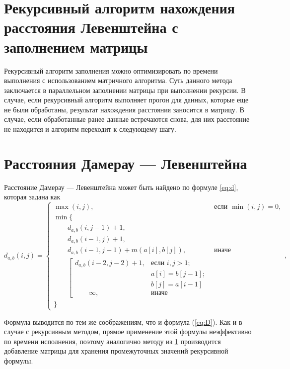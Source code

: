 \section{Рекурсивный алгоритм нахождения расстояния Левенштейна с заполнением матрицы}
\label{sec:recmat}

Рекурсивный алгоритм заполнения можно оптимизировать по времени выполнения с использованием матричного алгоритма. Суть данного метода заключается в параллельном заполнении матрицы при выполнении рекурсии. В случае, если рекурсивный алгоритм выполняет прогон для данных, которые еще не были обработаны, результат нахождения расстояния заносится в матрицу. В случае, если обработанные ранее данные встречаются снова, для них расстояние не находится и алгоритм переходит к следующему шагу.

\section{Расстояния Дамерау — Левенштейна}

Расстояние Дамерау — Левенштейна может быть найдено по формуле \ref{eq:d}, которая задана как
\begin{equation}
	\label{eq:d}
	d_{a,b}(i, j) = \begin{cases}
		\max(i, j), &\text{если }\min(i, j) = 0,\\
		\min \lbrace \\
			\qquad d_{a,b}(i, j-1) + 1,\\
			\qquad d_{a,b}(i-1, j) + 1,\\
			\qquad d_{a,b}(i-1, j-1) + m(a[i], b[j]), &\text{иначе}\\
			\qquad \left[ \begin{array}{cc}d_{a,b}(i-2, j-2) + 1, &\text{если }i,j > 1;\\
			\qquad &\text{}a[i] = b[j-1]; \\
			\qquad &\text{}b[j] = a[i-1]\\
			\qquad \infty, & \text{иначе}\end{array}\right.\\
		\rbrace
		\end{cases},
\end{equation}

Формула выводится по тем же соображениям, что и формула (\ref{eq:D}).
Как и в случае с рекурсивным методом, прямое применение этой формулы неэффективно по времени исполнения, поэтому аналогично методу из \ref{sec:recmat} производится добавление матрицы для хранения промежуточных значений рекурсивной формулы.

